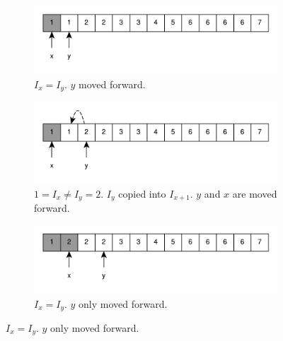 \begin{figure}
	\centering
	\vspace*{0.0in}
	\begin{subfigure}[t]{0.49\textwidth}
		\includegraphics[width=1\linewidth]{sources/remove_duplicated_sorted_array_inplace/images/example1_1}
		\vspace*{-8mm}
		\caption{$I_x = I_y$. $y$ moved forward.}
		\label{fig:remove_duplicated_sorted_array_inplace:example1_1}
	 \end{subfigure}
	 \hfill
	 \begin{subfigure}[t]{0.49\textwidth}
		\includegraphics[width=1\linewidth]{sources/remove_duplicated_sorted_array_inplace/images/example1_2}
		\vspace*{-8mm}
		\caption{$1 = I_x \neq I_y = 2$. $I_y$ copied into $I_{x+1}$. $y$ and $x$ are moved forward.}
		\label{fig:remove_duplicated_sorted_array_inplace:example1_2}
	 \end{subfigure}
	 \hfill
	 \begin{subfigure}[t]{0.49\textwidth}
		\includegraphics[width=1\linewidth]{sources/remove_duplicated_sorted_array_inplace/images/example1_3}
		\vspace*{-8mm}
		\caption{$I_x = I_y$. $y$ only moved forward.}
		\label{fig:remove_duplicated_sorted_array_inplace:example1_3}

\end{subfigure}
\end{figure}
